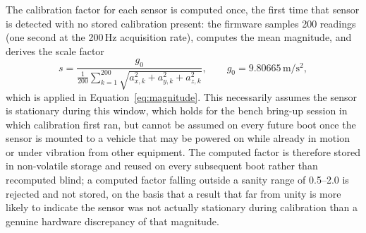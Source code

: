 The calibration factor for each sensor is computed once, the first time that sensor is detected with no stored calibration present: the firmware samples 200 readings (one second at the 200\,Hz acquisition rate), computes the mean magnitude, and derives the scale factor
\begin{equation}
s = \frac{g_0}{\frac{1}{200}\sum_{k=1}^{200} \sqrt{a_{x,k}^2 + a_{y,k}^2 + a_{z,k}^2}}, \qquad g_0 = 9.80665\,\mathrm{m/s^2},
\label{eq:calibration}
\end{equation}
which is applied in Equation~\eqref{eq:magnitude}. This necessarily assumes the sensor is stationary during this window, which holds for the bench bring-up session in which calibration first ran, but cannot be assumed on every future boot once the sensor is mounted to a vehicle that may be powered on while already in motion or under vibration from other equipment. The computed factor is therefore stored in non-volatile storage and reused on every subsequent boot rather than recomputed blind; a computed factor falling outside a sanity range of 0.5--2.0 is rejected and not stored, on the basis that a result that far from unity is more likely to indicate the sensor was not actually stationary during calibration than a genuine hardware discrepancy of that magnitude.

